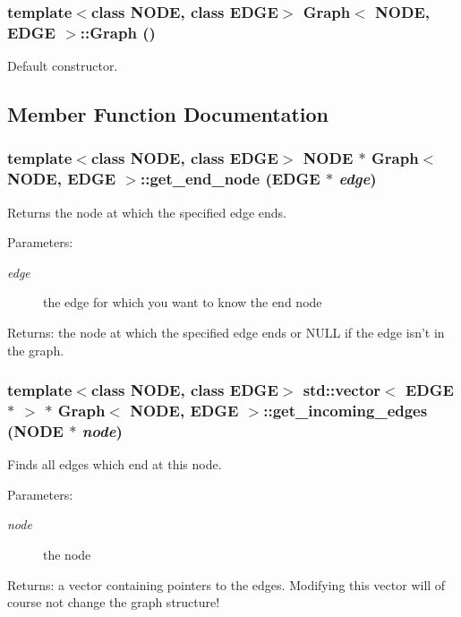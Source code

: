 \subsubsection{\setlength{\rightskip}{0pt plus 5cm}template$<$class NODE, class EDGE$>$ {\bf Graph}$<$ NODE, EDGE $>$::{\bf Graph} ()}\label{classGraph_Grapha0}


Default constructor. 



\subsection{Member Function Documentation}
\subsubsection{\setlength{\rightskip}{0pt plus 5cm}template$<$class NODE, class EDGE$>$ NODE $\ast$ {\bf Graph}$<$ NODE, EDGE $>$::get\_\-end\_\-node (EDGE $\ast$ {\em edge})}\label{classGraph_Grapha9}


Returns the node at which the specified edge ends. 

\begin{Desc}
\item[Parameters:]
\begin{description}
\item[{\em edge}]the edge for which you want to know the end node \end{description}
\end{Desc}
\begin{Desc}
\item[Returns:]the node at which the specified edge ends or NULL if the edge isn't in the graph.\end{Desc}
\subsubsection{\setlength{\rightskip}{0pt plus 5cm}template$<$class NODE, class EDGE$>$ std::vector$<$ EDGE $\ast$ $>$ $\ast$ {\bf Graph}$<$ NODE, EDGE $>$::get\_\-incoming\_\-edges (NODE $\ast$ {\em node})}\label{classGraph_Grapha7}


Finds all edges which end at this node. 

\begin{Desc}
\item[Parameters:]
\begin{description}
\item[{\em node}]the node \end{description}
\end{Desc}
\begin{Desc}
\item[Returns:]a vector containing pointers to the edges. Modifying this vector will of course not change the graph structure!\end{Desc}
